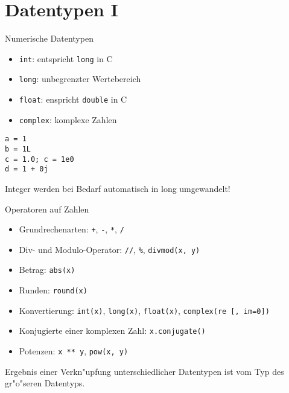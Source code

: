 \section{Datentypen I}

\begin{frame}[fragile]{Numerische Datentypen}
\begin{itemize}
\item \alert{\texttt{int}}: entspricht \texttt{long} in C
\item \alert{\texttt{long}}: unbegrenzter Wertebereich
\item \alert{\texttt{float}}: enspricht \texttt{double} in C 
\item \alert{\texttt{complex}}: komplexe Zahlen
\end{itemize} 
\begin{lstlisting}[style=Python]
a = 1
b = 1L
c = 1.0; c = 1e0
d = 1 + 0j
\end{lstlisting}
\vspace{3mm}
Integer werden bei Bedarf automatisch in long umgewandelt! 
\end{frame}

\begin{frame}{Operatoren auf Zahlen}
\begin{itemize}
\item \alert{Grundrechenarten}: \texttt{+}, \texttt{-}, \texttt{*}, \texttt{/}
\item Div- und Modulo-Operator: \texttt{//}, \hspace{1mm}\texttt{\%}, \hspace{1mm}\texttt{divmod(x, y)}
\item \alert{Betrag}: \texttt{abs(x)}
\item \alert{Runden}: \texttt{round(x)}
\item Konvertierung: \texttt{int(x)}, \texttt{long(x)}, \texttt{float(x)}, \texttt{complex(re~[, im=0])}
\item Konjugierte einer komplexen Zahl: \texttt{x.conjugate()}
\item \alert{Potenzen}: \texttt{x ** y}, \hspace{1mm}\texttt{pow(x, y)}
\end{itemize}
Ergebnis einer Verkn"upfung unterschiedlicher Datentypen ist vom Typ des \glqq gr"o"seren\grqq{} Datentyps.
\end{frame}

